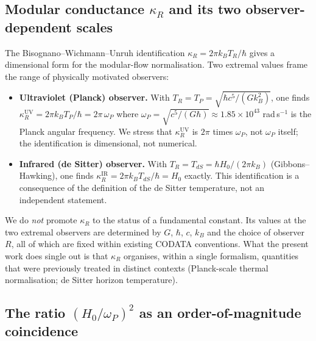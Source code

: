 \documentclass[aps,prd,superscriptaddress,nofootinbib,floatfix,10pt]{revtex4-2}
\theoremstyle{remark}
\newcommand{\kR}{\kappa_{R}}
\begin{document}
\subsection{Modular conductance $\kR$ and its two observer-dependent scales}
\label{sec:outlook:kappa}

The Bisognano--Wichmann--Unruh identification
$\kR = 2\pi k_{B} T_{R}/\hbar$ gives a dimensional form for the
modular-flow normalisation. Two extremal values frame the range of
physically motivated observers:

\begin{itemize}[leftmargin=2em,itemsep=4pt]
 \item \textbf{Ultraviolet (Planck) observer.} With $T_{R}=T_{P}=
   \sqrt{\hbar c^{5}/(G k_{B}^{2})}$, one finds
   $\kR^{\mathrm{UV}} = 2\pi k_{B} T_{P}/\hbar = 2\pi\,\omega_{P}$
   where $\omega_{P}=\sqrt{c^{5}/(G\hbar)}\approx 1.85\times 10^{43}$
   rad\,s$^{-1}$ is the Planck angular frequency. We stress that
   $\kR^{\mathrm{UV}}$ is $2\pi$ times $\omega_{P}$, not $\omega_{P}$
   itself; the identification is dimensional, not numerical.
 \item \textbf{Infrared (de Sitter) observer.} With $T_{R}=T_{dS}=
   \hbar H_{0}/(2\pi k_{B})$ (Gibbons--Hawking), one finds
   $\kR^{\mathrm{IR}} = 2\pi k_{B} T_{dS}/\hbar = H_{0}$ exactly. This
   identification is a consequence of the definition of the de Sitter
   temperature, not an independent statement.
\end{itemize}

We do \emph{not} promote $\kR$ to the status of a fundamental
constant. Its values at the two extremal observers are determined by
$G$, $\hbar$, $c$, $k_{B}$ and the choice of observer $R$, all of
which are fixed within existing CODATA conventions. What the present
work does single out is that $\kR$ organises, within a single
formalism, quantities that were previously treated in distinct
contexts (Planck-scale thermal normalisation; de Sitter horizon
temperature).

\subsection{The ratio $(H_{0}/\omega_{P})^{2}$ as an order-of-magnitude
coincidence}
\label{sec:outlook:cosmo-ratio}
\end{document}
